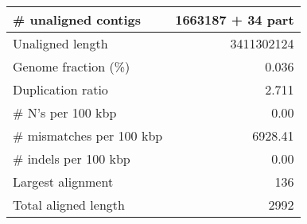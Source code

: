 \documentclass[12pt,a4paper]{article}
\begin{document}
\begin{table}[ht]
\begin{center}
\begin{tabular}{|l*{1}{|r}|}
\# unaligned contigs & 1663187 + 34 part \\ \hline
Unaligned length & 3411302124 \\ \hline
Genome fraction (\%) & 0.036 \\ \hline
Duplication ratio & 2.711 \\ \hline
\# N's per 100 kbp & 0.00 \\ \hline
\# mismatches per 100 kbp & 6928.41 \\ \hline
\# indels per 100 kbp & 0.00 \\ \hline
Largest alignment & 136 \\ \hline
Total aligned length & 2992 \\ \hline
\end{tabular}
\end{center}
\end{table}
\end{document}
